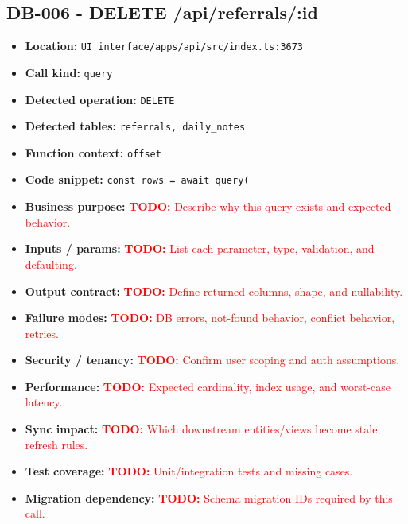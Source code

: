\documentclass[11pt]{article}
\newcommand{\todoitem}[1]{\textcolor{red}{\textbf{TODO:} #1}}
\begin{document}
\subsection{DB-006 - DELETE /api/referrals/:id}
\begin{itemize}[leftmargin=1.5em]
\item \textbf{Location:} \texttt{UI interface/apps/api/src/index.ts:3673}
\item \textbf{Call kind:} \texttt{query}
\item \textbf{Detected operation:} \texttt{DELETE}
\item \textbf{Detected tables:} \texttt{referrals, daily\_notes}
\item \textbf{Function context:} \texttt{offset}
\item \textbf{Code snippet:} \texttt{const rows = await query(}
\item \textbf{Business purpose:} \todoitem{Describe why this query exists and expected behavior.}
\item \textbf{Inputs / params:} \todoitem{List each parameter, type, validation, and defaulting.}
\item \textbf{Output contract:} \todoitem{Define returned columns, shape, and nullability.}
\item \textbf{Failure modes:} \todoitem{DB errors, not-found behavior, conflict behavior, retries.}
\item \textbf{Security / tenancy:} \todoitem{Confirm user scoping and auth assumptions.}
\item \textbf{Performance:} \todoitem{Expected cardinality, index usage, and worst-case latency.}
\item \textbf{Sync impact:} \todoitem{Which downstream entities/views become stale; refresh rules.}
\item \textbf{Test coverage:} \todoitem{Unit/integration tests and missing cases.}
\item \textbf{Migration dependency:} \todoitem{Schema migration IDs required by this call.}
\end{itemize}
\end{document}
